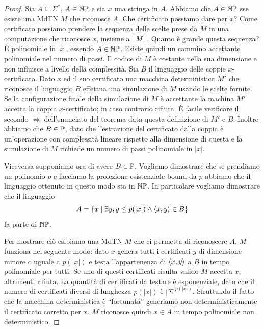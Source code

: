 \begin{proof}

    Sia $A \subseteq \Sigma^{*}$, $A \in \mathbb{NP}$ e sia $x$ una stringa in $A$. Abbiamo che $A \in
    \mathbb{NP}$ sse esiste una MdTN $M$ che riconosce $A$. Che certificato possiamo dare per $x$?
    Come certificato possiamo prendere la sequenza delle scelte prese da $M$ in una computazione che
    riconosce $x$, insieme a $\lceil M \rceil$. Quanto è grande questa sequenza? È polinomiale in $|x|$,
    essendo $A \in \mathbb{NP}$. Esiste quindi un cammino accettante polinomiale nel numero di passi.
    Il codice di $M$ è costante nella sua dimensione e non influisce a livello della complessità.
    Sia $B$ il linguaggio delle coppie $x$-certificato. Dato $x$ ed il suo certificato una macchina
    deterministica $M'$ che riconosce il linguaggio $B$ effettua una simulazione di $M$ usando le scelte
    fornite. Se la configurazione finale della simulazione di $M$ è accettante la machina $M'$
    accetta la coppia $x$-certificato; in caso contrario rifiuta. È facile verificare il secondo $\iff$
    dell'enunciato del teorema data questa definizione di $M'$ e $B$. Inoltre abbiamo che $B \in
    \mathbb{P}$, dato che l'estrazione del certificato dalla coppia è un'operazione con complessità
    lineare rispetto alla dimensione di questa e la simulazione di $M$ richiede un numero di passi
    polinomiale in $|x|$.

    Viceversa supponiamo ora di avere $B \in \mathbb{P}$. Vogliamo dimostrare che se prendiamo un
    polinomio $p$ e facciamo la proiezione esistenziale bound da $p$ abbiamo che il linguaggio
    ottenuto in questo modo sta in $\mathbb{NP}$. In particolare vogliamo dimostrare che il linguaggio
    \begin{equation*}
        A = \left\{x \mid \exists y, y \leq p(|x|) \land \langle x, y \rangle \in B\right\}
    \end{equation*}
    fa parte di $\mathbb{NP}$.

    Per mostrare ciò esibiamo una MdTN $M$ che ci permetta di riconoscere $A$. $M$ funziona nel
    seguente modo: dato $x$ genera tutti i certificati $y$ di dimensione minore o uguale a $p(|x|)$
    e testa l'appartenenza di $\langle x, y \rangle$ a $B$ in tempo polinomiale per tutti. Se uno di questi
    certificati risulta valido $M$ accetta $x$, altrimenti rifiuta. La quantità di certificati da
    testare è esponenziale, dato che il numero di certificati diversi di lunghezza $p(|x|)$ è
    $|\Sigma|^{p(|x|)}$. Sfruttando il fatto che la macchina deterministica è ``fortunata''
    generiamo non deterministicamente il certificato corretto per $x$. $M$ riconosce quindi $x
    \in A$ in tempo polinomiale non deterministico.

\end{proof}

